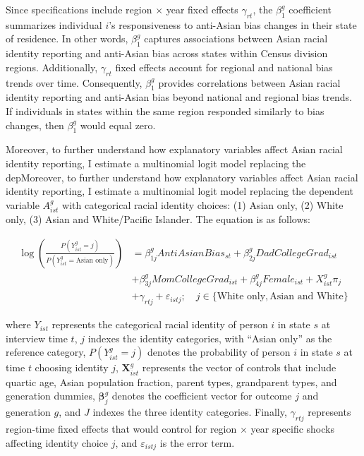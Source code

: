 Since specifications include region $\times$ year fixed effects $\gamma_{rt}$, the $\beta_1^g$ coefficient summarizes individual $i$'s responsiveness to anti-Asian bias changes in their state of residence. In other words, $\beta_1^g$ captures associations between Asian racial identity reporting and anti-Asian bias across states within Census division regions. Additionally, $\gamma_{rt}$ fixed effects account for regional and national bias trends over time. Consequently, $\beta_1^g$ provides correlations between Asian racial identity reporting and anti-Asian bias beyond national and regional bias trends. If individuals in states within the same region responded similarly to bias changes, then $\beta_1^g$ would equal zero.

Moreover, to further understand how explanatory variables affect Asian racial identity reporting, I estimate a multinomial logit model replacing the depMoreover, to further understand how explanatory variables affect Asian racial identity reporting, I estimate a multinomial logit model replacing the dependent variable $A_{ist}^g$ with categorical racial identity choices: (1) Asian only, (2) White only, (3) Asian and White/Pacific Islander. The equation is as follows:

\begin{align}
\log\left(\frac{P(Y_{ist}^g = j)}{P(Y_{ist}^g = \text{Asian only})}\right) &= \beta_{1j}^g AntiAsianBias_{st} + \beta_{2j}^g DadCollegeGrad_{ist}\nonumber \\ 
& + \beta_{3j}^g MomCollegeGrad_{ist} + \beta_{4j}^g Female_{ist} + X_{ist}^g\pi_j  \nonumber \\ 
& + \gamma_{rtj} + \varepsilon_{istj}; \quad j \in \{\text{White only}, \text{Asian and White}\} \label{eq:multinomial_logit}
\end{align}

where $Y_{ist}$ represents the categorical racial identity of person $i$ in state $s$ at interview time $t$, $j$ indexes the identity categories, with ``Asian only'' as the reference category, $P(Y_{ist}^g = j)$ denotes the probability of person $i$ in state $s$ at time $t$ choosing identity $j$, $\mathbf{X}_{ist}^g$ represents the vector of controls that include quartic age, Asian population fraction, parent types, grandparent types, and generation dummies, $\boldsymbol{\beta}_j^g$ denotes the coefficient vector for outcome $j$ and generation $g$, and $J$ indexes the three identity categories. Finally, $\gamma_{rtj}$ represents region-time fixed effects that would control for region $\times$ year specific shocks affecting identity choice $j$, and $\varepsilon_{istj}$ is the error term.

